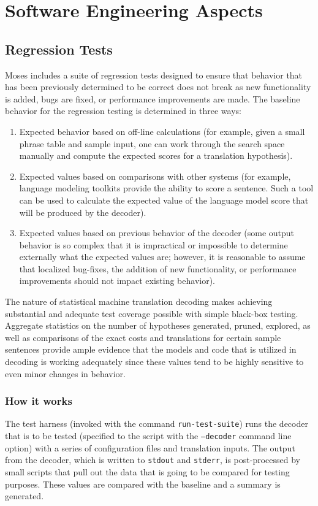 \documentclass[11pt]{book}
\theoremstyle{plain}
\begin{document}
\section{Software Engineering Aspects}

\subsection{Regression Tests}
Moses includes a suite of regression tests designed to ensure that
behavior that has been previously determined to be correct does not
break as new functionality is added, bugs are fixed, or performance
improvements are made. The baseline behavior for the regression
testing is determined in three ways:
\begin{enumerate}
  \item Expected behavior based on off-line calculations (for example,
  given a small phrase table and sample input, one can work through
  the search space manually and compute the expected scores for a translation hypothesis).
  \item Expected values based on comparisons with other systems (for
  example, language modeling toolkits provide the ability to score
  a sentence.  Such a tool can be used to calculate the expected value of
  the language model score that will be produced by the decoder).
  \item Expected values based on previous behavior of the decoder (some output behavior
  is so complex that it is impractical or impossible to determine externally
  what the expected values are; however, it is reasonable to assume that localized bug-fixes,
  the addition of new functionality, or performance improvements should not impact existing
  behavior).
\end{enumerate}
The nature of statistical machine translation decoding makes
achieving substantial and adequate test coverage possible with
simple black-box testing.  Aggregate statistics on the number of
hypotheses generated, pruned, explored, as well as comparisons of
the exact costs and translations for certain sample sentences
provide ample evidence that the models and code that is utilized in
decoding is working adequately since these values tend to be highly
sensitive to even minor changes in behavior.

\subsubsection{How it works}
The test harness (invoked with the command \texttt{run-test-suite})
runs the decoder that is to be tested (specified to the script with
the \texttt{--decoder} command line option) with a series of
configuration files and translation inputs.  The output from the
decoder, which is written to \texttt{stdout} and \texttt{stderr}, is
post-processed by small scripts that pull out the data that is going
to be compared for testing purposes.  These values are compared with
the baseline and a summary is generated.
\end{document}
